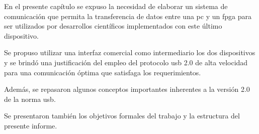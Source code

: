 En el presente capítulo se expuso la necesidad de elaborar un sistema de comunicación que permita la transferencia de datos entre una \acrshort{pc} y un \acrshort{fpga} para ser utilizados por desarrollos científicos implementados con este último dispositivo.

Se propuso utilizar una interfaz comercial como intermediario los dos dispositivos y se brindó una justificación del empleo del protocolo \acrshort{usb} 2.0 de alta velocidad para una comunicación óptima que satisfaga los requerimientos.

Además, se repasaron algunos conceptos importantes inherentes a la versión 2.0 de la norma \acrshort{usb}.

Se presentaron también los objetivos formales del trabajo y la estructura del presente informe.